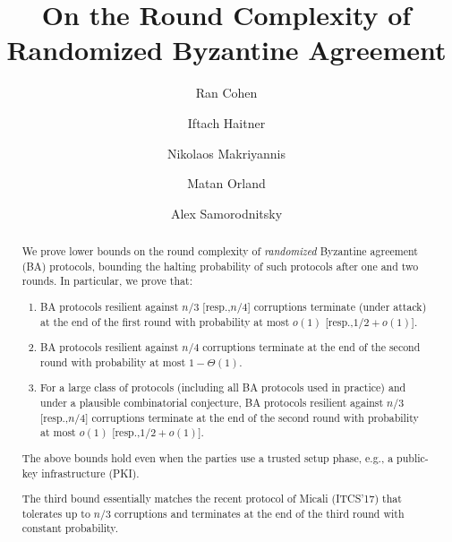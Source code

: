 \documentclass[a4paper,UKenglish,cleveref, autoref]{lipics-v2019}
\title{On the Round Complexity of Randomized Byzantine Agreement} %
\author{Ran Cohen}{Boston University and Northeastern University, USA }
{rancohen@ccs.neu.edu}
{}{Research supported by the Northeastern University Cybersecurity and Privacy Institute Post-doctoral fellowship, IARPA under award 2019-19020700009 (ACHILLES), NSF grant TWC-1664445, NSF grant 1422965, and by the NSF MACS project. Some of this work was done while the author was a post-doc at Tel Aviv University, supported by ERC starting grant 638121.}
\author{Iftach Haitner}{School of Computer Science, Tel Aviv University, Israel}{iftachh@cs.tau.ac.il}{}{Member of the Check Point Institute for Information Security. Research supported by ERC starting grant 638121.}
\author{Nikolaos Makriyannis}{Department of Computer Science, Technion, Israel}{n.makriyannis@gmail.com}{}{Research supported by ERC starting grant 638121 and by ERC advanced grant 742754.}
\author{Matan Orland}{School of Computer Science, Tel Aviv University, Israel}{matanorland@mail.tau.ac.il}{}{Research supported by ERC starting grant 638121.}
\author{Alex Samorodnitsky}{School of Engineering and Computer Science, The Hebrew University of Jerusalem, Israel}{salex@cs.huji.ac.il}{}{Research partially supported by ISF grant 1724/15.}
\newcommand{\resp}{resp.,\xspace}
\newcommand{\eg}  {e.g.,\xspace}
\theoremstyle{plain}
\begin{document}
\maketitle

\begin{abstract}
We prove lower bounds on the round complexity of \emph{randomized} Byzantine agreement (BA) protocols,
bounding the halting probability of such protocols after one and two rounds. In particular, we prove that:
\begin{enumerate}
\item
BA protocols resilient against $n/3$ [\resp $n/4$] corruptions terminate (under attack) at the end of the first round with probability at most $o(1)$ [\resp $1/2+ o(1)$].

\item
BA protocols resilient against $n/4$ corruptions terminate at the end of the second round with probability at most $1-\Theta(1)$.

\item
For a large class of protocols (including all BA protocols used in practice) and under a plausible combinatorial conjecture, BA protocols resilient against $n/3$ [\resp $n/4$] corruptions terminate at the end of the second round with probability at most $o(1)$ [\resp $1/2 + o(1)$].
\end{enumerate}
The above bounds hold even when the parties use a trusted setup phase, \eg a public-key infrastructure (PKI).

The third bound essentially matches the recent protocol of Micali (ITCS'17) that tolerates up to $n/3$ corruptions and terminates at the end of the third round with constant probability.
\end{abstract}






\end{document}
